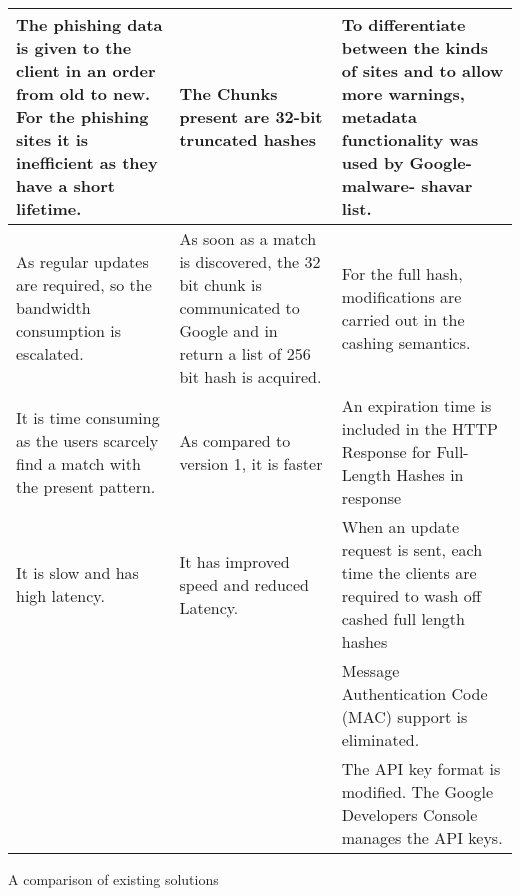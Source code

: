 \begin{singlespace}
\begin{center}
\begin{tabular}{ | m{13em} | m{12.9em} | m{13em} | }
			\hline
			The phishing data is given to the client in
			an order from old to new. For the
			phishing sites it is inefficient as they
			have a short lifetime.                 & The Chunks present are 32-bit
			truncated hashes                       & To differentiate between the kinds of sites and
			to allow more warnings, metadata
			functionality was used by Google-malware-
			shavar list.                                                                                                                           \\
			\hline
			As regular updates are required, so the
			bandwidth consumption is escalated.    & As soon as a match is discovered,
			the 32 bit chunk is
			communicated to Google and in
			return a list of 256 bit hash is
			acquired.                              & For the full hash, modifications are carried out
			in the cashing semantics.                                                                                                              \\
			\hline

			It is time consuming as the users scarcely
			find a match with the present pattern. & As compared to version 1, it is
			faster                                 & An expiration time is included in the HTTP
			Response for Full-Length Hashes in
			response                                                                                                                               \\
			\hline

			It is slow and has high latency.       & It has improved speed and reduced
			Latency.                               & When an update request is sent, each time the
			clients are required to wash off cashed full
			length hashes                                                                                                                          \\
			\hline
			                                       &                                                  & Message Authentication Code (MAC) support
			is eliminated.                                                                                                                         \\
			\hline
			                                       &                                                  & The API key format is modified. The Google
			Developers Console manages the API keys.                                                                                               \\
			\hline
		\end{tabular}
		\captionsetup{type=table}\caption{A comparison of existing solutions \citep{INTELLIGENT_PHISHING_ANFIS}}
	\end{center}
\end{singlespace}


